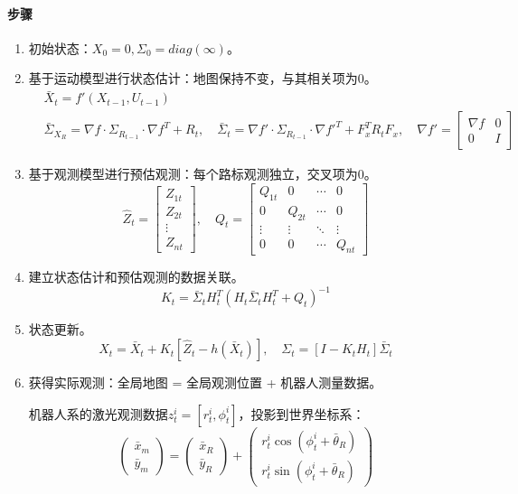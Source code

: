 \documentclass[
12pt, %
a4paper, 
oneside, %
headinclude,footinclude, %
]{scrartcl}
\begin{document}
\paragraph{步骤}
\begin{enumerate}
\item 初始状态：$ X_0 = 0, \Sigma_0 = diag(\infty) $。
\item 基于运动模型进行状态估计：地图保持不变，与其相关项为$ 0 $。
\begin{align*}
&\bar{X}_t = f'(X_{t - 1}, U_{t - 1}) \\
&\bar{\Sigma}_{X_R} = \nabla f \cdot \Sigma_{R_{t - 1}} \cdot \nabla f^T + R_t, \quad
\bar{\Sigma}_t = \nabla f' \cdot \Sigma_{R_{t - 1}} \cdot \nabla f'^T + F_x^T R_t F_x, \quad
\nabla f' = \begin{bmatrix} \nabla f & 0 \\ 0 & I \end{bmatrix}
\end{align*}
\item 基于观测模型进行预估观测：每个路标观测独立，交叉项为$ 0 $。
$$
\hat{Z}_t = \begin{bmatrix} Z_{1t} \\ Z_{2t} \\ \vdots \\ Z_{nt} \end{bmatrix}, \quad
Q_t = \begin{bmatrix} Q_{1t} & 0 & \cdots & 0 \\ 0 & Q_{2t} & \cdots & 0 \\ \vdots & \vdots & \ddots & \vdots \\ 0 & 0 & \cdots & Q_{nt} \end{bmatrix}
$$
\item 建立状态估计和预估观测的数据关联。
$$ K_t = \bar{\Sigma}_t H_t^T (H_t \bar{\Sigma}_t H_t^T + Q_t)^{-1} $$
\item 状态更新。
$$ 
X_t = \bar{X}_t + K_t[\hat{Z}_t - h(\bar{X}_t)], \quad
\Sigma_t = [I - K_t H_t]\bar{\Sigma}_t 
$$
\item 获得实际观测：全局地图 = 全局观测位置 + 机器人测量数据。

机器人系的激光观测数据$ z^i_t = [r_t^i, \phi_t^i] $，投影到世界坐标系：
$$ \begin{pmatrix} \bar{x}_m \\ \bar{y}_m \end{pmatrix} = \begin{pmatrix} \bar{x}_R \\ \bar{y}_R \end{pmatrix} + \begin{pmatrix} r_t^i \cos (\phi_t^i + \bar{\theta}_R) \\ r_t^i \sin (\phi_t^i + \bar{\theta}_R) \end{pmatrix} $$


\end{enumerate}
\end{document}
